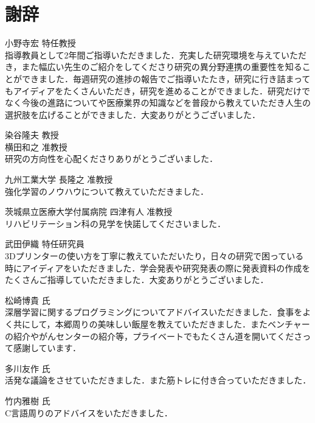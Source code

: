 \chapter*{謝辞}%
%

小野寺宏 特任教授\\
指導教員として2年間ご指導いただきました．充実した研究環境を与えていただき，また幅広い先生のご紹介をしてくださり研究の異分野連携の重要性を知ることができました．毎週研究の進捗の報告でご指導いたたき，研究に行き詰まってもアイディアをたくさんいただき，研究を進めることができました．研究だけでなく今後の進路についてや医療業界の知識などを普段から教えていただき人生の選択肢を広げることができました．大変ありがとうございました．

染谷隆夫 教授\\

横田和之 准教授\\
研究の方向性を心配くださりありがとうございました．

九州工業大学 長隆之 准教授\\
強化学習のノウハウについて教えていただきました．

茨城県立医療大学付属病院 四津有人 准教授\\
リハビリテーション科の見学を快諾してくださいました．

武田伊織 特任研究員\\
3Dプリンターの使い方を丁寧に教えていただいたり，日々の研究で困っている時にアイディアをいただきました．学会発表や研究発表の際に発表資料の作成をたくさんご指導していただきました．大変ありがとうございました．

松崎博貴 氏\\
深層学習に関するプログラミングについてアドバイスいただきました．食事をよく共にして，本郷周りの美味しい飯屋を教えていただきました．またベンチャーの紹介やがんセンターの紹介等，プライベートでもたくさん道を開いてくださって感謝しています．

多川友作 氏\\
活発な議論をさせていただきました．また筋トレに付き合っていただきました．

竹内雅樹 氏\\
C言語周りのアドバイスをいただきました．

